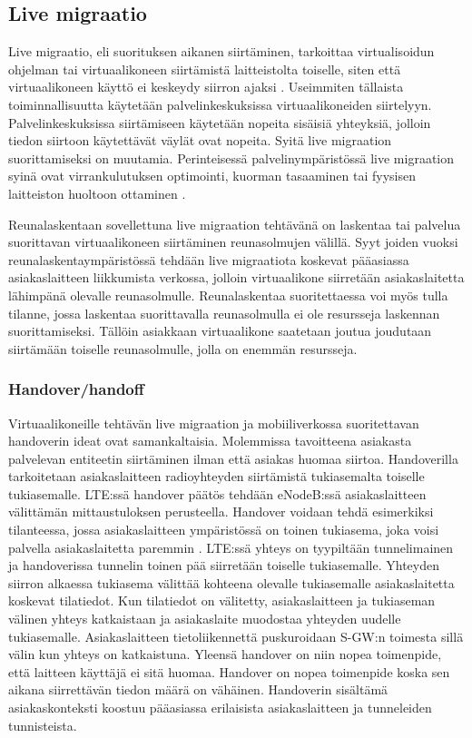 \subsection{Live migraatio} \label{livemigraatio}

Live migraatio, eli suorituksen aikanen siirtäminen, tarkoittaa virtualisoidun ohjelman tai virtuaalikoneen siirtämistä laitteistolta toiselle, siten että virtuaalikoneen käyttö ei keskeydy siirron ajaksi \cite{clark2005live}. 
Useimmiten tällaista toiminnallisuutta käytetään palvelinkeskuksissa virtuaalikoneiden
siirtelyyn. Palvelinkeskuksissa siirtämiseen käytetään nopeita sisäisiä yhteyksiä,
jolloin tiedon siirtoon käytettävät väylät ovat nopeita. Syitä live migraation
suorittamiseksi on muutamia. Perinteisessä palvelinympäristössä live migraation
syinä ovat virrankulutuksen optimointi, kuorman tasaaminen tai fyysisen
laitteiston huoltoon ottaminen \cite{soni2013comparative}. 

Reunalaskentaan sovellettuna live migraation tehtävänä on laskentaa tai palvelua suorittavan virtuaalikoneen siirtäminen reunasolmujen välillä.
Syyt joiden vuoksi reunalaskentaympäristössä tehdään live migraatiota koskevat pääasiassa asiakaslaitteen liikkumista verkossa, jolloin virtuaalikone siirretään asiakaslaitetta lähimpänä olevalle  reunasolmulle. 
Reunalaskentaa suoritettaessa voi myös tulla tilanne, jossa laskentaa suorittavalla reunasolmulla ei ole resursseja laskennan suorittamiseksi. Tällöin asiakkaan virtuaalikone saatetaan joutua joudutaan siirtämään toiselle reunasolmulle, jolla on enemmän resursseja.  


\subsubsection*{Handover/handoff}%
Virtuaalikoneille tehtävän live migraation ja mobiiliverkossa suoritettavan handoverin ideat ovat samankaltaisia. Molemmissa tavoitteena asiakasta palvelevan entiteetin siirtäminen ilman että asiakas huomaa siirtoa.
Handoverilla tarkoitetaan asiakaslaitteen radioyhteyden siirtämistä tukiasemalta toiselle tukiasemalle. 
LTE:ssä handover päätös tehdään eNodeB:ssä asiakaslaitteen välittämän mittaustuloksen perusteella. 
Handover voidaan tehdä esimerkiksi tilanteessa, jossa asiakaslaitteen ympäristössä on toinen tukiasema, joka voisi palvella asiakaslaitetta paremmin \cite[s.~96]{etsilte}.
LTE:ssä yhteys on tyypiltään tunnelimainen ja handoverissa tunnelin toinen pää siirretään toiselle tukiasemalle.
Yhteyden siirron alkaessa tukiasema välittää kohteena olevalle tukiasemalle asiakaslaitetta koskevat tilatiedot. Kun tilatiedot on välitetty, asiakaslaitteen ja tukiaseman välinen yhteys katkaistaan ja asiakaslaite muodostaa yhteyden uudelle tukiasemalle.
Asiakaslaitteen tietoliikennettä puskuroidaan S-GW:n toimesta sillä välin kun yhteys on katkaistuna. Yleensä handover on niin nopea toimenpide, että laitteen käyttäjä ei sitä huomaa.
Handover on nopea toimenpide koska sen aikana siirrettävän tiedon määrä on vähäinen.
Handoverin sisältämä asiakaskonteksti koostuu pääasiassa erilaisista asiakaslaitteen ja tunneleiden tunnisteista.

